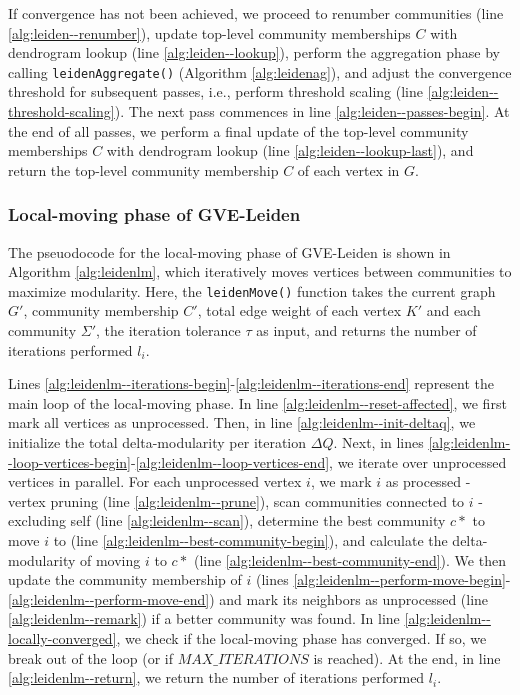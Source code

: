 If convergence has not been achieved, we proceed to renumber communities (line \ref{alg:leiden--renumber}), update top-level community memberships $C$ with dendrogram lookup (line \ref{alg:leiden--lookup}), perform the aggregation phase by calling \texttt{leidenAggregate()} (Algorithm \ref{alg:leidenag}), and adjust the convergence threshold for subsequent passes, i.e., perform threshold scaling (line \ref{alg:leiden--threshold-scaling}). The next pass commences in line \ref{alg:leiden--passes-begin}. At the end of all passes, we perform a final update of the top-level community memberships $C$ with dendrogram lookup (line \ref{alg:leiden--lookup-last}), and return the top-level community membership $C$ of each vertex in $G$.







\subsubsection{Local-moving phase of GVE-Leiden}

The pseuodocode for the local-moving phase of GVE-Leiden is shown in Algorithm \ref{alg:leidenlm}, which iteratively moves vertices between communities to maximize modularity. Here, the \texttt{leidenMove()} function takes the current graph $G'$, community membership $C'$, total edge weight of each vertex $K'$ and each community $\Sigma'$, the iteration tolerance $\tau$ as input, and returns the number of iterations performed $l_i$.

Lines \ref{alg:leidenlm--iterations-begin}-\ref{alg:leidenlm--iterations-end} represent the main loop of the local-moving phase. In line \ref{alg:leidenlm--reset-affected}, we first mark all vertices as unprocessed. Then, in line \ref{alg:leidenlm--init-deltaq}, we initialize the total delta-modularity per iteration $\Delta Q$. Next, in lines \ref{alg:leidenlm--loop-vertices-begin}-\ref{alg:leidenlm--loop-vertices-end}, we iterate over unprocessed vertices in parallel. For each unprocessed vertex $i$, we mark $i$ as processed - vertex pruning (line \ref{alg:leidenlm--prune}), scan communities connected to $i$ - excluding self (line \ref{alg:leidenlm--scan}), determine the best community $c*$ to move $i$ to (line \ref{alg:leidenlm--best-community-begin}), and calculate the delta-modularity of moving $i$ to $c*$ (line \ref{alg:leidenlm--best-community-end}). We then update the community membership of $i$ (lines \ref{alg:leidenlm--perform-move-begin}-\ref{alg:leidenlm--perform-move-end}) and mark its neighbors as unprocessed (line \ref{alg:leidenlm--remark}) if a better community was found. In line \ref{alg:leidenlm--locally-converged}, we check if the local-moving phase has converged. If so, we break out of the loop (or if $MAX\_ITERATIONS$ is reached). At the end, in line \ref{alg:leidenlm--return}, we return the number of iterations performed $l_i$.


